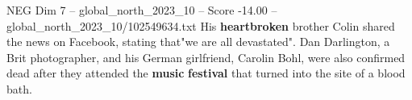 \begin{textsample}{NEG Dim 7 – global\_north\_2023\_10 – Score -14.00 – global\_north\_2023\_10/102549634.txt}
His \textbf{heartbroken} brother Colin shared the news on Facebook, stating that"we are all devastated".
Dan Darlington, a Brit photographer, and his German girlfriend, Carolin Bohl, were also confirmed dead after they attended the \textbf{music} \textbf{festival} that turned into the site of a blood bath.

\end{textsample}
